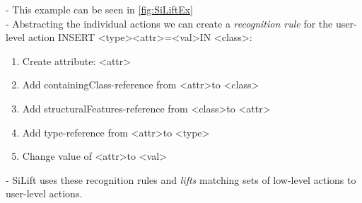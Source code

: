 \documentclass[10pt,a4paper,oneside]{scrartcl}
\begin{document}
	- This example can be seen in \ref{fig:SiLiftEx}
	\\
	- Abstracting the individual actions we can create a \textit{recognition rule} for the user-level action INSERT \textless type\textgreater  \textless attr\textgreater=\textless val\textgreater  IN \textless class\textgreater :
	\begin{enumerate}
		\item Create attribute: \textless attr\textgreater
		\item Add containingClass-reference from \textless attr\textgreater  to \textless class\textgreater
		\item Add structuralFeatures-reference from \textless class\textgreater  to \textless attr\textgreater
		\item Add type-reference from \textless attr\textgreater  to \textless type\textgreater
		\item Change value of \textless attr\textgreater  to \textless val\textgreater
	\end{enumerate}
	- SiLift uses these recognition rules and \textit{lifts} matching sets of low-level actions to user-level actions.
	\\
	
\end{document}
